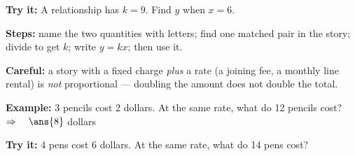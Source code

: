 \documentclass[12pt]{article}
\begin{document}
\begin{tryitbox}
\textbf{Try it:} A relationship has $k = 9$. Find $y$ when $x = 6$.\\[2pt]
\end{tryitbox}


\begin{formulabox}
\textbf{Steps:} name the two quantities with letters; find one matched pair in the
story; divide to get $k$; write $y = kx$; then use it.\par
\textbf{Careful:} a story with a fixed charge \emph{plus} a rate (a joining fee, a
monthly line rental) is \emph{not} proportional --- doubling the amount does not
double the total.
\end{formulabox}

\begin{examplebox}
\textbf{Example:} 3 pencils cost 2 dollars. At the same rate, what do 12 pencils cost?
$\Rightarrow\quad \ans{8}$ dollars
\end{examplebox}

\begin{tryitbox}
\textbf{Try it:} 4 pens cost 6 dollars. At the same rate, what do 14 pens cost?\\[2pt]
\end{tryitbox}
\end{document}

